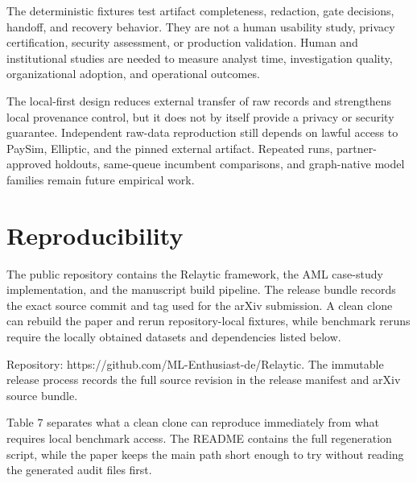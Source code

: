 \documentclass[11pt]{article}
\begin{document}
The deterministic fixtures test artifact completeness, redaction, gate decisions, handoff, and recovery behavior. They are not a human usability study, privacy certification, security assessment, or production validation. Human and institutional studies are needed to measure analyst time, investigation quality, organizational adoption, and operational outcomes.

The local-first design reduces external transfer of raw records and strengthens local provenance control, but it does not by itself provide a privacy or security guarantee. Independent raw-data reproduction still depends on lawful access to PaySim, Elliptic, and the pinned external artifact. Repeated runs, partner-approved holdouts, same-queue incumbent comparisons, and graph-native model families remain future empirical work.

\section{Reproducibility}

The public repository contains the Relaytic framework, the AML case-study implementation, and the manuscript build pipeline. The release bundle records the exact source commit and tag used for the arXiv submission. A clean clone can rebuild the paper and rerun repository-local fixtures, while benchmark reruns require the locally obtained datasets and dependencies listed below.

Repository: https://github.com/ML-Enthusiast-de/Relaytic. The immutable release process records the full source revision in the release manifest and arXiv source bundle.

Table 7 separates what a clean clone can reproduce immediately from what requires local benchmark access. The README contains the full regeneration script, while the paper keeps the main path short enough to try without reading the generated audit files first.
\end{document}
